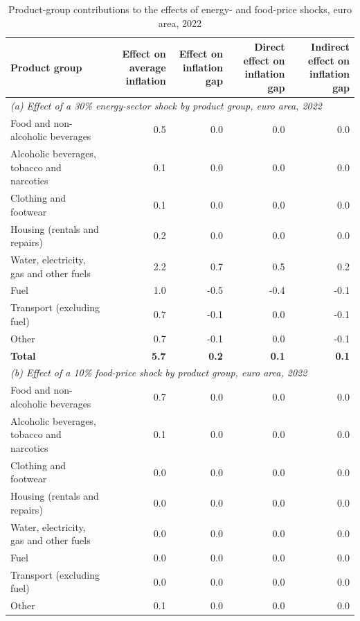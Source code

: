 \begin{table}[H]

\caption{\label{tab:shock-oil-gas-chain-ea20}Product-group contributions to the effects of energy- and food-price shocks, euro area, 2022}
\centering
\scriptsize
\setlength{\tabcolsep}{3.0pt}
\begin{tabular}[t]{lrrrr}
\toprule
Product group & \shortstack{Effect on average\\ inflation} & \shortstack{Effect on\\ inflation gap} & \shortstack{Direct effect on\\ inflation gap} & \shortstack{Indirect effect on\\ inflation gap}\\
\midrule
\multicolumn{5}{l}{\textit{(a) Effect of a 30\% energy-sector shock by product group, euro area, 2022}}\\
Food and non-alcoholic beverages & 0.5 & 0.0 & 0.0 & 0.0\\
Alcoholic beverages, tobacco and narcotics & 0.1 & 0.0 & 0.0 & 0.0\\
Clothing and footwear & 0.1 & 0.0 & 0.0 & 0.0\\
Housing (rentals and repairs) & 0.2 & 0.0 & 0.0 & 0.0\\
Water, electricity, gas and other fuels & 2.2 & 0.7 & 0.5 & 0.2\\
Fuel & 1.0 & -0.5 & -0.4 & -0.1\\
Transport (excluding fuel) & 0.7 & -0.1 & 0.0 & -0.1\\
Other & 0.7 & -0.1 & 0.0 & -0.1\\
\textbf{Total} & \textbf{5.7} & \textbf{0.2} & \textbf{0.1} & \textbf{0.1}\\
\midrule
\multicolumn{5}{l}{\textit{(b) Effect of a 10\% food-price shock by product group, euro area, 2022}}\\
Food and non-alcoholic beverages & 0.7 & 0.0 & 0.0 & 0.0\\
Alcoholic beverages, tobacco and narcotics & 0.1 & 0.0 & 0.0 & 0.0\\
Clothing and footwear & 0.0 & 0.0 & 0.0 & 0.0\\
Housing (rentals and repairs) & 0.0 & 0.0 & 0.0 & 0.0\\
Water, electricity, gas and other fuels & 0.0 & 0.0 & 0.0 & 0.0\\
Fuel & 0.0 & 0.0 & 0.0 & 0.0\\
Transport (excluding fuel) & 0.0 & 0.0 & 0.0 & 0.0\\
Other & 0.1 & 0.0 & 0.0 & 0.0\\

\end{tabular}
\end{table}
